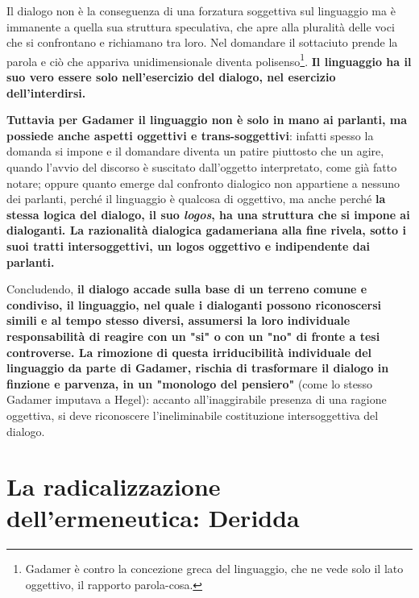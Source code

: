 Il dialogo non è la conseguenza di una forzatura soggettiva sul linguaggio ma è immanente a quella sua struttura speculativa, che apre alla pluralità delle voci che si confrontano e richiamano tra loro. Nel domandare il sottaciuto prende la parola e ciò che appariva unidimensionale diventa polisenso\footnote{Gadamer è contro la concezione greca del linguaggio, che ne vede solo il lato oggettivo, il rapporto parola-cosa.}. \textbf{Il linguaggio ha il suo vero essere solo nell'esercizio del dialogo, nel esercizio dell'interdirsi.}

\textbf{Tuttavia per Gadamer il linguaggio non è solo in mano ai parlanti, ma possiede anche aspetti oggettivi e trans-soggettivi}: infatti spesso la domanda si impone e il domandare diventa un patire piuttosto che un agire, quando l'avvio del discorso è suscitato dall'oggetto interpretato, come già fatto notare; oppure quanto emerge dal confronto dialogico non appartiene a nessuno dei parlanti, perché il linguaggio è qualcosa di oggettivo, ma anche perché \textbf{la stessa logica del dialogo, il suo \textit{logos}, ha una struttura che si impone ai dialoganti. La razionalità dialogica gadameriana alla fine rivela, sotto i suoi tratti intersoggettivi, un logos oggettivo e indipendente dai parlanti.}

Concludendo,\textbf{ il dialogo accade sulla base di un terreno comune e condiviso, il linguaggio, nel quale i dialoganti possono riconoscersi simili e al tempo stesso diversi, assumersi la loro individuale responsabilità di reagire con un "si" o con un "no" di fronte a tesi controverse. La rimozione di questa irriducibilità individuale del linguaggio da parte di Gadamer, rischia di trasformare il dialogo in finzione e parvenza, in un "monologo del pensiero"} (come lo stesso Gadamer imputava a Hegel): accanto all'inaggirabile presenza di una ragione oggettiva, si deve riconoscere l'ineliminabile costituzione intersoggettiva del dialogo.

\section{La radicalizzazione dell'ermeneutica: Deridda}

